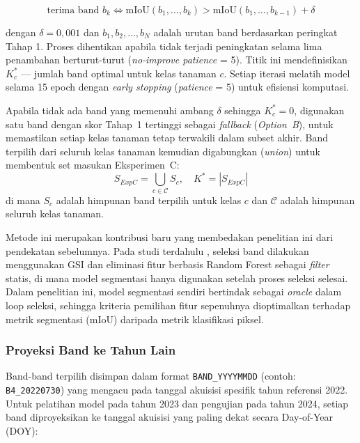 \begin{equation}
    \text{terima band } b_k \iff \text{mIoU}(b_1, \ldots, b_k) > \text{mIoU}(b_1, \ldots, b_{k-1}) + \delta
\end{equation}

dengan $\delta = 0{,}001$ dan $b_1, b_2, \ldots, b_N$ adalah urutan band berdasarkan peringkat Tahap 1.
Proses dihentikan apabila tidak terjadi peningkatan selama lima penambahan berturut-turut (\textit{no-improve patience} = 5).
Titik ini mendefinisikan $K^*_c$ --- jumlah band optimal untuk kelas tanaman $c$.
Setiap iterasi melatih model selama 15 epoch dengan \textit{early stopping} (\textit{patience} = 5) untuk efisiensi komputasi.

Apabila tidak ada band yang memenuhi ambang $\delta$ sehingga $K^*_c = 0$, digunakan satu band dengan skor Tahap~1 tertinggi sebagai \textit{fallback} (\textit{Option~B}), untuk memastikan setiap kelas tanaman tetap terwakili dalam subset akhir.
Band terpilih dari seluruh kelas tanaman kemudian digabungkan (\textit{union}) untuk membentuk set masukan Eksperimen~C:
\begin{equation}
    S_{ExpC} = \bigcup_{c \in \mathcal{C}} S_c, \quad K^* = |S_{ExpC}|
\end{equation}
di mana $S_c$ adalah himpunan band terpilih untuk kelas $c$ dan $\mathcal{C}$ adalah himpunan seluruh kelas tanaman.

Metode ini merupakan kontribusi baru yang membedakan penelitian ini dari pendekatan sebelumnya. Pada studi terdahulu \citep{li2023hetao}, seleksi band dilakukan menggunakan GSI dan eliminasi fitur berbasis Random Forest sebagai \textit{filter} statis, di mana model segmentasi hanya digunakan setelah proses seleksi selesai. Dalam penelitian ini, model segmentasi sendiri bertindak sebagai \textit{oracle} dalam loop seleksi, sehingga kriteria pemilihan fitur sepenuhnya dioptimalkan terhadap metrik segmentasi (mIoU) daripada metrik klasifikasi piksel.

\subsubsection{Proyeksi Band ke Tahun Lain}
\label{subsubsec:band_projection}

Band-band terpilih disimpan dalam format \texttt{BAND\_YYYYMMDD} (contoh: \texttt{B4\_20220730}) yang mengacu pada tanggal akuisisi spesifik tahun referensi 2022.
Untuk pelatihan model pada tahun 2023 dan pengujian pada tahun 2024, setiap band diproyeksikan ke tanggal akuisisi yang paling dekat secara Day-of-Year (DOY):

